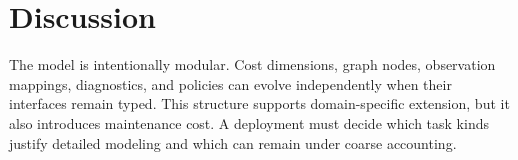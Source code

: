 \section{Discussion}
\label{sec:discussion}

The model is intentionally modular. Cost dimensions, graph nodes, observation
mappings, diagnostics, and policies can evolve independently when their
interfaces remain typed. This structure supports domain-specific extension, but
it also introduces maintenance cost. A deployment must decide which task kinds
justify detailed modeling and which can remain under coarse accounting.
